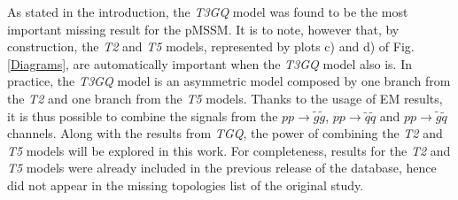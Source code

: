\documentclass[preprint,number,sort&compress,twocolumn,3p]{elsstyarticle}
\begin{document}
%
As stated in the introduction, the \textit{T3GQ} model was found to be the most important missing result for the pMSSM. It is to note, however that, by construction, the \textit{T2} and \textit{T5} models, represented by plots c) and d) of Fig. \ref{Diagrams}, are automatically important when the \textit{T3GQ} model also is. In practice, the \textit{T3GQ} model is an asymmetric model composed by one branch from the \textit{T2} and one branch from the \textit{T5} models. Thanks to the usage of EM results, it is thus possible to combine the signals from the $pp \rightarrow \tilde g \tilde g$, $pp \rightarrow \tilde q \tilde q$ and $pp \rightarrow \tilde g \tilde q$ channels. Along with the results from \textit{TGQ}, the power of combining the \textit{T2} and \textit{T5} models will be explored in this work. For completeness, results for the \textit{T2} and \textit{T5} models were already included in the previous release of the database, hence did not appear in the missing topologies list of the original study. 
\end{document}
